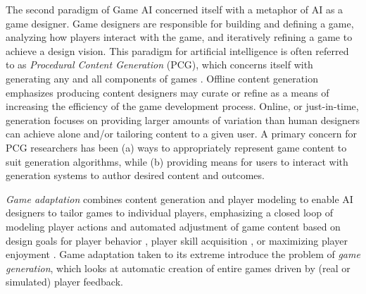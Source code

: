 \documentclass[conference]{IEEEtran}
\begin{document}
%
The second paradigm of Game AI concerned itself with a metaphor of AI as a game designer. 
Game designers are responsible for building and defining a game, analyzing how players interact with the game, and iteratively refining a game to achieve a design vision. 
%
This paradigm for artificial intelligence is often referred to as {\em Procedural Content Generation} (PCG), which concerns itself with generating any and all components of games \cite{hendrikx2013:pcg, togelius2011:sbpcg, yannakakis2012:gameai-revisited}.
% 
%
Offline content generation emphasizes producing content designers may curate or refine as a means of increasing the efficiency of the game development process.
Online, or just-in-time, generation focuses on providing larger amounts of variation than human designers can achieve alone and/or tailoring content to a given user.
A primary concern for PCG researchers has been (a) ways to appropriately represent game content to suit generation algorithms, while (b) providing means for users to interact with generation systems to author desired content and outcomes.

{\em Game adaptation} combines content generation and player modeling to enable AI designers to tailor games to individual players, emphasizing a closed loop of modeling player actions and automated adjustment of game content based on design goals for player behavior \cite{smith2012:refraction}, player skill acquisition \cite{andersen2013:trace}, or maximizing player enjoyment \cite{yu2012:prefix-based, thue2007:storytell-pm, shaker2010:platformer-gen}.
%
Game adaptation taken to its extreme introduce the problem of {\em game generation}, which looks at automatic creation of entire games driven by (real or simulated) player feedback.
\end{document}
